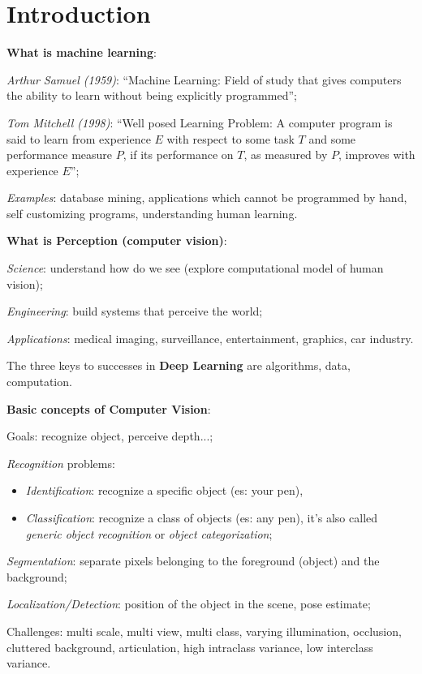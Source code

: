 \section{Introduction}\label{sec:intro}

\textbf{What is machine learning}:
\begin{myitem}
    \item \textit{Arthur Samuel (1959)}: “Machine Learning: Field of study that gives computers the ability to learn without being explicitly programmed”;
    \item \textit{Tom Mitchell (1998)}: “Well posed Learning Problem: A computer program is said to learn from experience $E$ with respect to some task $T$ and some performance measure $P$, if its performance on $T$, as measured by $P$, improves with experience $E$”;
    \item \textit{Examples}: database mining, applications which cannot be programmed by hand, self customizing programs, understanding human learning.
\end{myitem}

\textbf{What is Perception (computer vision)}:
\begin{myitem}
    \item \textit{Science}: understand how do we see (explore computational model of human vision);
    \item \textit{Engineering}: build systems that perceive the world;
    \item \textit{Applications}: medical imaging, surveillance, entertainment, graphics, car industry.
\end{myitem}

The three keys to successes in \textbf{Deep Learning} are algorithms, data, computation.

\textbf{Basic concepts of Computer Vision}:
\begin{myitem}
    \item Goals: recognize object, perceive depth...;
    \item \textit{Recognition} problems:
    \begin{itemize}
        \item \textit{Identification}: recognize a specific object (es: your pen),
        \item \textit{Classification}: recognize a class of objects (es: any pen), it's also called \textit{generic object recognition} or \textit{object categorization};
    \end{itemize}
    \item \textit{Segmentation}: separate pixels belonging to the foreground (object) and the background;
    \item \textit{Localization/Detection}: position of the object in the scene, pose estimate;
    \item Challenges: multi scale, multi view, multi class, varying illumination, occlusion, cluttered background, articulation, high intraclass variance, low interclass variance.
\end{myitem}
